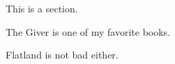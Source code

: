This is a section. 

The Giver \citep{lowry1993giver} is one of my favorite books.

Flatland \citep{abbott1884flatland} is not bad either.
